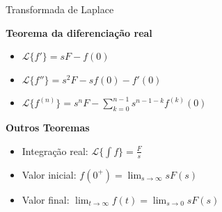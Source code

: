 \begin{frame}
\begin{columns}[t]
\begin{block}{Transformada de Laplace}
\begin{itemize}
      \end{itemize}
      \textbf{Teorema da diferenciação real}
      \begin{itemize}
        \item $\mathcal{L}\{f'\}=sF-f(0)$
        \item $\mathcal{L}\{f''\}=s^2F-sf(0)-f'(0)$
        \item $\mathcal{L}\{f^{(n)}\}=s^nF-\sum_{k=0}^{n-1}s^{n-1-k}f^{(k)}(0)$
      \end{itemize}
      \textbf{Outros Teoremas}
      \begin{itemize}
        \item Integração real: $\mathcal{L}\{\int f\}=\frac{F}{s}$
        \item Valor inicial: $f(0^+)=\lim_{s\to\infty}sF(s)$
        \item Valor final: $\lim_{t\to\infty}f(t)=\lim_{s\to0}sF(s)$
      \end{itemize}
    \end{block}
  \end{columns}
\end{frame}

